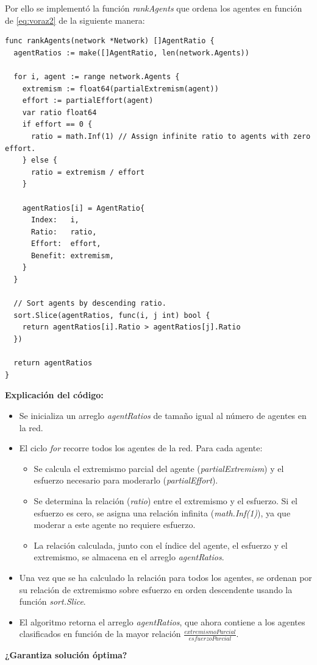 \documentclass[letterpaper,10pt]{article}
\begin{document}
Por ello se implementó la función \textit{rankAgents} que ordena los agentes en función de \eqref{eq:voraz2} de la siguiente manera:
\begin{lstlisting}[caption={Rank Agents}, label={lst:rank_agents}]
func rankAgents(network *Network) []AgentRatio {
  agentRatios := make([]AgentRatio, len(network.Agents))

  for i, agent := range network.Agents {
    extremism := float64(partialExtremism(agent))
    effort := partialEffort(agent)
    var ratio float64
    if effort == 0 {
      ratio = math.Inf(1) // Assign infinite ratio to agents with zero effort.
    } else {
      ratio = extremism / effort
    }

    agentRatios[i] = AgentRatio{
      Index:   i,
      Ratio:   ratio,
      Effort:  effort,
      Benefit: extremism,
    }
  }

  // Sort agents by descending ratio.
  sort.Slice(agentRatios, func(i, j int) bool {
    return agentRatios[i].Ratio > agentRatios[j].Ratio
  })

  return agentRatios
}
\end{lstlisting}
\textbf{Explicación del código:}
\begin{itemize}
  \item Se inicializa un arreglo \textit{agentRatios} de tamaño igual al número de agentes en la red.
  \item El ciclo \textit{for} recorre todos los agentes de la red. Para cada agente:
  \begin{itemize}
    \item Se calcula el extremismo parcial del agente (\textit{partialExtremism}) y el esfuerzo necesario para moderarlo (\textit{partialEffort}).
    \item Se determina la relación (\textit{ratio}) entre el extremismo y el esfuerzo. Si el esfuerzo es cero, se asigna una relación infinita (\textit{math.Inf(1)}), ya que moderar a este agente no requiere esfuerzo.
    \item La relación calculada, junto con el índice del agente, el esfuerzo y el extremismo, se almacena en el arreglo \textit{agentRatios}.
  \end{itemize}
  \item Una vez que se ha calculado la relación para todos los agentes, se ordenan por su relación de extremismo sobre esfuerzo en orden descendente usando la función \textit{sort.Slice}.
  \item El algoritmo retorna el arreglo \textit{agentRatios}, que ahora contiene a los agentes clasificados en función de la mayor relación $\frac{extremismoParcial}{esfuerzoParcial}$.
\end{itemize}
\textbf{¿Garantiza solución óptima?}
\end{document}

